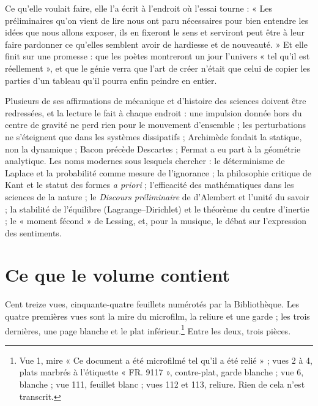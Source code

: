 \documentclass[11pt,a4paper]{article}
\begin{document}
\begin{resume}
Ce qu'elle voulait faire, elle l'a écrit à l'endroit où l'essai tourne : « Les
préliminaires qu'on vient de lire nous ont paru nécessaires pour bien entendre
les idées que nous allons exposer, ils en fixeront le sens et serviront peut être
à leur faire pardonner ce qu'elles semblent avoir de hardiesse et de nouveauté. »
Et elle finit sur une promesse : que les poètes montreront un jour l'univers « tel
qu'il est réellement », et que le génie verra que l'art de créer n'était que celui
de copier les parties d'un tableau qu'il pourra enfin peindre en entier.

Plusieurs de ses affirmations de mécanique et d'histoire des sciences doivent être
redressées, et la lecture le fait à chaque endroit : une impulsion donnée hors du
centre de gravité ne perd rien pour le mouvement d'ensemble ; les perturbations
ne s'éteignent que dans les systèmes dissipatifs ; Archimède fondait la statique,
non la dynamique ; Bacon précède Descartes ; Fermat a eu part à la géométrie
analytique. Les noms modernes sous lesquels chercher : le déterminisme de Laplace
et la probabilité comme mesure de l'ignorance ; la philosophie critique de Kant et
le statut des formes \emph{a priori} ; l'efficacité des mathématiques dans les
sciences de la nature ; le \emph{Discours préliminaire} de d'Alembert et l'unité
du savoir ; la stabilité de l'équilibre (Lagrange–Dirichlet) et le théorème du
centre d'inertie ; le « moment fécond » de Lessing, et, pour la musique, le débat
sur l'expression des sentiments.

\end{resume}

\section*{Ce que le volume contient}

Cent treize vues, cinquante-quatre feuillets numérotés par la Bibliothèque.
Les quatre premières vues sont la mire du microfilm, la reliure et une garde ;
les trois dernières, une page blanche et le plat inférieur.\footnote{Vue 1,
mire « Ce document a été microfilmé tel qu'il a été relié » ; vues 2 à 4, plats
marbrés à l'étiquette « FR. 9117 », contre-plat, garde blanche ; vue 6,
blanche ; vue 111, feuillet blanc ; vues 112 et 113, reliure. Rien de cela n'est
transcrit.} Entre les deux, trois pièces.
\end{document}
